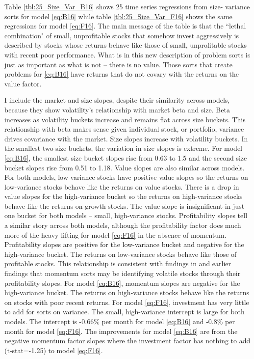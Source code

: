 
Table \ref{tbl:25_Size_Var_B16} shows 25 time series regressions from size-
variance sorts for model \ref{eq:B16} while table \ref{tbl:25_Size_Var_F16}
shows the same regressions for model \ref{eq:F16}. The main message of the
table is that the ``lethal combination" of small, unprofitable stocks that
somehow invest aggressively is described by stocks whose returns behave like
those of small, unprofitable stocks with recent poor performance. What is in
this new description of problem sorts is just as important as what is not --
there is no value. Those sorts that create problems for \ref{eq:B16} have
returns that do not covary with the returns on the value factor.

I include the market and size slopes, despite their similarity across models,
because they show volatility's relationship with market beta and size. Beta
increases as volatility buckets increase and remains flat across size buckets.
This relationship with beta makes sense given individual stock, or portfolio,
variance drives covariance with the market. Size slopes increase with
volatility buckets.
In the smallest two size buckets, the variation in size
slopes is extreme.
For model \ref{eq:B16}, the smallest size bucket slopes rise from 0.63 to 1.5
and the second size bucket slopes rise from 0.51 to 1.18.
Value slopes are also similar across models.
For both models, low-variance stocks have positive value slopes so
the returns on low-variance stocks behave like the returns on value stocks.
There is a drop in value slopes for the high-variance bucket so
the returns on high-variance stocks behave like the returns on growth stocks.
The value slope is insignificant in just one bucket for both models -- small,
high-variance stocks.
Profitability slopes tell a similar story across both models,
although the profitability factor does much more of the heavy lifting for model
\ref{eq:F16} in the absence of momentum.
Profitability slopes are positive for the low-variance bucket and negative for
the high-variance bucket.
The returns on low-variance stocks behave like those of profitable stocks.
This relationship is consistent with findings in
\textcite{novy2014understanding} and earlier findings that momentum sorts
may be identifying volatile stocks through their profitability slopes.
For model \ref{eq:B16}, momentum slopes are negative for the high-variance
bucket.
The returns on high-variance stocks behave like the returns on stocks with poor
recent returns. 
For model \ref{eq:F16}, investment has very little to add for sorts on
variance.
The small, high-variance intercept is large for both models.
The intercept is -0.66\% per month for model \ref{eq:B16} and -0.8\% per month
for model \ref{eq:F16}.
The improvements for model \ref{eq:B16} are from the negative momentum factor
slopes where the investment factor has nothing to add (t-stat=-1.25) to model
\ref{eq:F16}.

